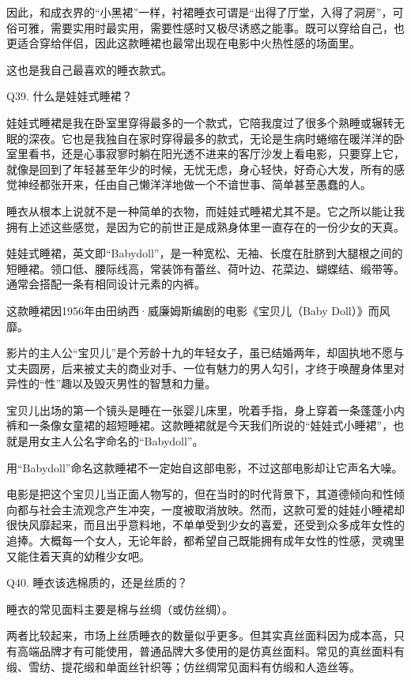 \documentclass[12pt,UTF8]{ctexbook}
\begin{document}
因此，和成衣界的“小黑裙”一样，衬裙睡衣可谓是“出得了厅堂，入得了洞房”，可俗可雅，需要实用时最实用，需要性感时又极尽诱惑之能事。既可以穿给自己，也更适合穿给伴侣，因此这款睡裙也最常出现在电影中火热性感的场面里。

这也是我自己最喜欢的睡衣款式。





Q39. 什么是娃娃式睡裙？


娃娃式睡裙是我在卧室里穿得最多的一个款式，它陪我度过了很多个熟睡或辗转无眠的深夜。它也是我独自在家时穿得最多的款式，无论是生病时蜷缩在暖洋洋的卧室里看书，还是心事寂寥时躺在阳光透不进来的客厅沙发上看电影，只要穿上它，就像是回到了年轻甚至年少的时候，无忧无虑，身心轻快，好奇心大发，所有的感觉神经都张开来，任由自己懒洋洋地做一个不谙世事、简单甚至愚蠢的人。

睡衣从根本上说就不是一种简单的衣物，而娃娃式睡裙尤其不是。它之所以能让我拥有上述这些感觉，是因为它的前世正是成熟身体里一直存在的一份少女的天真。



娃娃式睡裙，英文即“Babydoll”，是一种宽松、无袖、长度在肚脐到大腿根之间的短睡裙。领口低、腰际线高，常装饰有蕾丝、荷叶边、花菜边、蝴蝶结、缎带等。通常会搭配一条有相同设计元素的内裤。

这款睡裙因1956年由田纳西·威廉姆斯编剧的电影《宝贝儿（Baby Doll）》而风靡。

影片的主人公“宝贝儿”是个芳龄十九的年轻女子，虽已结婚两年，却固执地不愿与丈夫圆房，后来被丈夫的商业对手、一位有魅力的男人勾引，才终于唤醒身体里对异性的“性”趣以及毁灭男性的智慧和力量。

宝贝儿出场的第一个镜头是睡在一张婴儿床里，吮着手指，身上穿着一条蓬蓬小内裤和一条像女童裙的超短睡裙。这款睡裙就是今天我们所说的“娃娃式小睡裙”，也就是用女主人公名字命名的“Babydoll”。

用“Babydoll”命名这款睡裙不一定始自这部电影，不过这部电影却让它声名大噪。

电影是把这个宝贝儿当正面人物写的，但在当时的时代背景下，其道德倾向和性倾向都与社会主流观念产生冲突，一度被取消放映。然而，这款可爱的娃娃小睡裙却很快风靡起来，而且出乎意料地，不单单受到少女的喜爱，还受到众多成年女性的追捧。大概每一个女人，无论年龄，都希望自己既能拥有成年女性的性感，灵魂里又能住着天真的幼稚少女吧。





Q40. 睡衣该选棉质的，还是丝质的？


睡衣的常见面料主要是棉与丝绸（或仿丝绸）。

两者比较起来，市场上丝质睡衣的数量似乎更多。但其实真丝面料因为成本高，只有高端品牌才有可能使用，普通品牌大多使用的是仿真丝面料。常见的真丝面料有缎、雪纺、提花缎和单面丝针织等；仿丝绸常见面料有仿缎和人造丝等。
\end{document}
